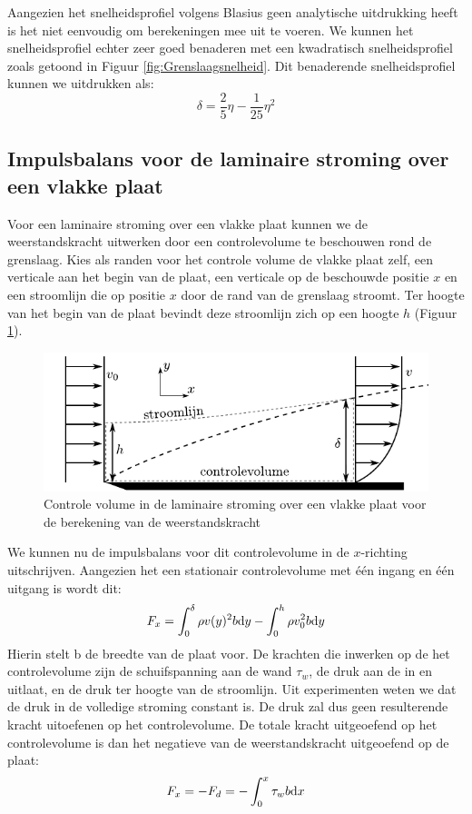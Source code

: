 Aangezien het snelheidsprofiel volgens Blasius geen analytische uitdrukking heeft is het niet eenvoudig om berekeningen mee uit te voeren. We kunnen het snelheidsprofiel echter zeer goed benaderen met een kwadratisch snelheidsprofiel zoals getoond in Figuur \ref{fig:Grenslaagsnelheid}. Dit benaderende snelheidsprofiel kunnen we uitdrukken als:
\begin{equation}
	\delta = \frac{2}{5}\eta - \frac{1}{25}\eta^2
\end{equation}

		\subsection{Impulsbalans voor de laminaire stroming over een vlakke plaat}
		\label{sec:Impulsbalans voor de laminaire stroming over een vlakke plaat}
Voor een laminaire stroming over een vlakke plaat kunnen we de weerstandskracht uitwerken door een controlevolume te beschouwen rond de grenslaag. Kies als randen voor het controle volume de vlakke plaat zelf, een verticale aan het begin van de plaat, een verticale op de beschouwde positie $x$ en een stroomlijn die op positie $x$ door de rand van de grenslaag stroomt. Ter hoogte van het begin van de plaat bevindt deze stroomlijn zich op een hoogte $h$ (Figuur \ref{fig:Laminaire_genslaag_controlevolume}).
\begin{figure}[htb]
	\centering
	\includegraphics{fig/uitwendige_stroming/Laminaire_grenslaag_controlevolume}
	\caption{Controle volume in de laminaire stroming over een vlakke plaat voor de berekening van de weerstandskracht}
	\label{fig:Laminaire_genslaag_controlevolume}
\end{figure}

We kunnen nu de impulsbalans voor dit controlevolume in de $x$-richting uitschrijven. Aangezien het een stationair controlevolume met één ingang en één uitgang is wordt dit:
\begin{equation}
	F_x = \int_0^{\delta} \rho v(y)^2 b \mathrm{d} y  - \int_0^{h} \rho v_0^2 b \mathrm{d} y
	\label{eqn:laminaire grenslaag impuls}
\end{equation}
Hierin stelt b de breedte van de plaat voor. De krachten die inwerken op de het controlevolume zijn de schuifspanning aan de wand $\tau_w$, de druk aan de in en uitlaat, en de druk ter hoogte van de stroomlijn. Uit experimenten weten we dat de druk in de volledige stroming constant is. De druk zal dus geen resulterende kracht uitoefenen op het controlevolume. De totale kracht uitgeoefend op het controlevolume is dan het negatieve van de weerstandskracht uitgeoefend op de plaat:
\begin{equation}
	F_x = -F_d = -\int_0^x \tau_w b \mathrm{d} x
\end{equation}

